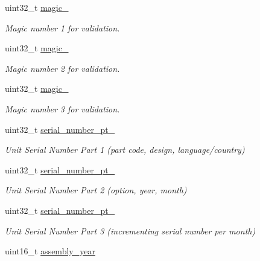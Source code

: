\begin{DoxyCompactItemize}
\item 
uint32\+\_\+t \hyperlink{struct____mavlink__gimbal__set__factory__parameters__t_a48153bb064112dd2d2b6138f06ff4f93}{magic\+\_}
\begin{DoxyCompactList}\small\item\em Magic number 1 for validation. \end{DoxyCompactList}\item 
uint32\+\_\+t \hyperlink{struct____mavlink__gimbal__set__factory__parameters__t_a62e523d452667492d1eee29792538246}{magic\+\_}
\begin{DoxyCompactList}\small\item\em Magic number 2 for validation. \end{DoxyCompactList}\item 
uint32\+\_\+t \hyperlink{struct____mavlink__gimbal__set__factory__parameters__t_a43fef3fc7a04534bc762211c3d9a719b}{magic\+\_}
\begin{DoxyCompactList}\small\item\em Magic number 3 for validation. \end{DoxyCompactList}\item 
uint32\+\_\+t \hyperlink{struct____mavlink__gimbal__set__factory__parameters__t_a12d9b6b8f1a4085d01d8cc115237e0c6}{serial\+\_\+number\+\_\+pt\+\_}
\begin{DoxyCompactList}\small\item\em Unit Serial Number Part 1 (part code, design, language/country) \end{DoxyCompactList}\item 
uint32\+\_\+t \hyperlink{struct____mavlink__gimbal__set__factory__parameters__t_ae98b73f26572a57c98cd294c6cae1990}{serial\+\_\+number\+\_\+pt\+\_}
\begin{DoxyCompactList}\small\item\em Unit Serial Number Part 2 (option, year, month) \end{DoxyCompactList}\item 
uint32\+\_\+t \hyperlink{struct____mavlink__gimbal__set__factory__parameters__t_a52b7e67c5823f3dd4b76f59d87c0231c}{serial\+\_\+number\+\_\+pt\+\_}
\begin{DoxyCompactList}\small\item\em Unit Serial Number Part 3 (incrementing serial number per month) \end{DoxyCompactList}\item 
uint16\+\_\+t \hyperlink{struct____mavlink__gimbal__set__factory__parameters__t_a1bc09c454d7a30c76131898f56f22261}{assembly\+\_\+year}

\end{DoxyCompactItemize}
